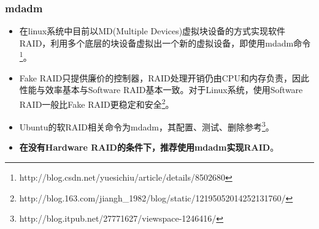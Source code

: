 \subsubsection{mdadm}
\begin{itemize}
\item 在linux系统中目前以MD(Multiple Devices)虚拟块设备的方式实现软件RAID，利用多个底层的块设备虚拟出一个新的虚拟设备，即使用mdadm命令\footnote{http://blog.csdn.net/yuesichiu/article/details/8502680}。

\item Fake RAID只提供廉价的控制器，RAID处理开销仍由CPU和内存负责，因此性能与效率基本与Software RAID基本一致。对于Linux系统，使用Software RAID一般比Fake RAID更稳定和安全\footnote{http://blog.163.com/jiangh\_1982/blog/static/12195052014252131760/}。

\item Ubuntu的软RAID相关命令为mdadm，其配置、测试、删除参考\footnote{http://blog.itpub.net/27771627/viewspace-1246416/}。 

\item \textbf{在没有Hardware RAID的条件下，推荐使用mdadm实现RAID}。
\end{itemize}


